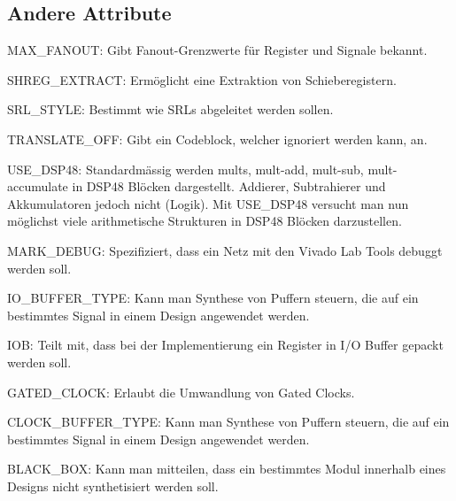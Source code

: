 \subsection{Andere Attribute}
\begin{compactitem}
    \item MAX\_FANOUT: Gibt Fanout-Grenzwerte für Register und Signale bekannt.
    \item SHREG\_EXTRACT: Ermöglicht eine Extraktion von Schieberegistern.
    \item SRL\_STYLE: Bestimmt wie SRLs abgeleitet werden sollen.
    \item TRANSLATE\_OFF: Gibt ein Codeblock, welcher ignoriert werden kann, an.
    \item USE\_DSP48: Standardmässig werden mults, mult-add, mult-sub, mult-accumulate in DSP48 Blöcken dargestellt. Addierer, Subtrahierer und Akkumulatoren jedoch nicht (Logik). Mit USE\_DSP48 versucht man nun möglichst viele arithmetische Strukturen in DSP48 Blöcken darzustellen.
    \item MARK\_DEBUG: Spezifiziert, dass ein Netz mit den Vivado Lab Tools debuggt werden soll.
    \item IO\_BUFFER\_TYPE: Kann man Synthese von Puffern steuern, die auf ein bestimmtes Signal in einem Design angewendet werden.
    \item IOB: Teilt mit, dass bei der Implementierung ein Register in I/O Buffer gepackt werden soll.
    \item GATED\_CLOCK: Erlaubt die Umwandlung von Gated Clocks.
    \item CLOCK\_BUFFER\_TYPE: Kann man Synthese von Puffern steuern, die auf ein bestimmtes Signal in einem Design angewendet werden.
    \item BLACK\_BOX: Kann man mitteilen, dass ein bestimmtes Modul innerhalb eines Designs nicht synthetisiert werden soll.
\end{compactitem}
